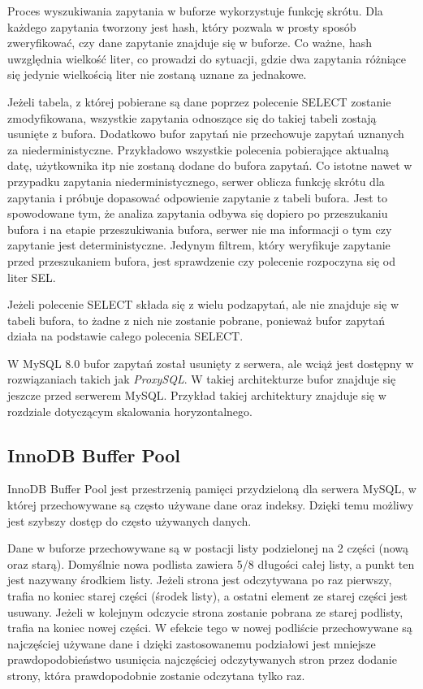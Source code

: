 Proces wyszukiwania zapytania w buforze wykorzystuje funkcję skrótu. Dla każdego zapytania tworzony jest hash, który pozwala w prosty sposób zweryfikować, czy dane zapytanie znajduje się w buforze. Co ważne, hash uwzględnia wielkość liter, co prowadzi do sytuacji, gdzie dwa zapytania różniące się jedynie wielkością liter nie zostaną uznane za jednakowe.

Jeżeli tabela, z której pobierane są dane poprzez polecenie SELECT  zostanie zmodyfikowana, wszystkie zapytania odnoszące się do takiej tabeli zostają usunięte z bufora. Dodatkowo bufor zapytań nie przechowuje zapytań uznanych za niederministyczne. Przykładowo wszystkie polecenia pobierające aktualną datę, użytkownika itp nie zostaną dodane do bufora zapytań. Co istotne nawet w przypadku zapytania niederministycznego, serwer oblicza funkcję skrótu dla zapytania i próbuje dopasować odpowienie zapytanie z tabeli bufora. Jest to spowodowane tym, że analiza zapytania odbywa się dopiero po przeszukaniu bufora i na etapie przeszukiwania bufora, serwer nie ma informacji o tym czy zapytanie jest deterministyczne. Jedynym filtrem, który weryfikuje zapytanie przed przeszukaniem bufora, jest sprawdzenie czy polecenie rozpoczyna się od liter SEL.

Jeżeli polecenie SELECT składa się z wielu podzapytań, ale nie znajduje się w tabeli bufora, to żadne z nich nie zostanie pobrane, ponieważ bufor zapytań działa na podstawie całego polecenia SELECT.

W MySQL 8.0 bufor zapytań został usunięty z serwera, ale wciąż jest dostępny w rozwiązaniach takich jak \textit{ProxySQL}. W takiej architekturze bufor znajduje się jeszcze przed serwerem MySQL. Przykład takiej architektury znajduje się w rozdziale dotyczącym skalowania horyzontalnego.

\subsection{InnoDB Buffer Pool}

InnoDB Buffer Pool jest przestrzenią pamięci przydzieloną dla serwera MySQL, w której przechowywane są często używane dane oraz indeksy. Dzięki temu możliwy jest szybszy dostęp do często używanych danych. 

Dane w buforze przechowywane są w postacji listy podzielonej na 2 części (nową oraz starą).  Domyślnie nowa podlista zawiera 5/8 długości całej listy, a punkt ten jest nazywany środkiem listy. Jeżeli strona jest odczytywana po raz pierwszy, trafia no koniec starej części (środek listy), a ostatni element ze starej części jest usuwany. Jeżeli w kolejnym odczycie strona zostanie pobrana ze starej podlisty, trafia na koniec nowej części. W efekcie tego w nowej podliście przechowywane są najczęściej używane dane i dzięki zastosowanemu podziałowi jest mniejsze prawdopodobieństwo usunięcia najczęściej odczytywanych stron przez dodanie strony, która prawdopodobnie zostanie odczytana tylko raz.


